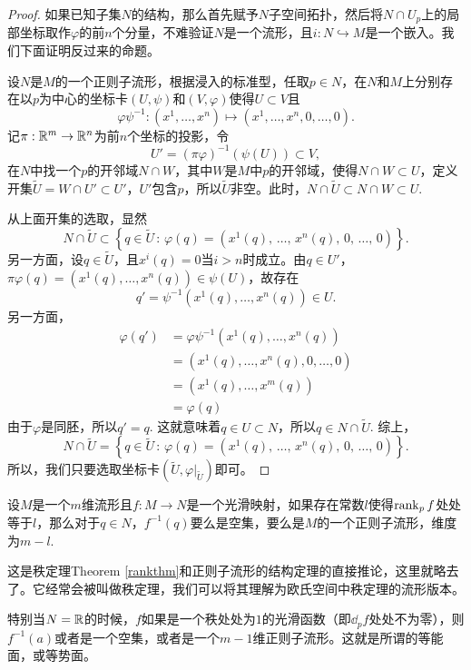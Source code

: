 \begin{proof}
如果已知子集$N$的结构，那么首先赋予$N$子空间拓扑，然后将$N\cap U_p$上的局部坐标取作$\varphi$的前$n$个分量，不难验证$N$是一个流形，且$i:N\hookrightarrow M$是一个嵌入。我们下面证明反过来的命题。

设$N$是$M$的一个正则子流形，根据浸入的标准型，任取$p\in N$，在$N$和$M$上分别存在以$p$为中心的坐标卡$(U,\psi)$和$(V,\varphi)$使得$U\subset V$且
\[
	\varphi\psi^{-1}:(x^1,\dots,x^n)\mapsto (x^1,\dots,x^n,0,\dots,0).
\]
记$\pi:\mathbb{R}^m\to \mathbb{R}^n$为前$n$个坐标的投影，令
\[
	U'=(\pi\varphi)^{-1}(\psi(U))\subset V,
\]
在$N$中找一个$p$的开邻域$N\cap W$，其中$W$是$M$中$p$的开邻域，使得$N\cap W\subset U$，定义开集$\tilde{U}=W\cap U'\subset U'$，$U'$包含$p$，所以$\tilde{U}$非空。此时，$N\cap \tilde{U}\subset N\cap W\subset U$.

从上面开集的选取，显然
\[
	N\cap \tilde{U}\subset \left\{q\in \tilde{U}\,:\,\varphi(q)=\left(x^1(q)\text{, $\dots$, }x^n(q)\text{, }0\text{, $\dots$, }0\right)\right\}.
\]
另一方面，设$q\in \tilde{U}$，且$x^i(q)=0$当$i> n$时成立。由$q\in U'$，$\pi\varphi(q)=(x^1(q),\dots,x^n(q))\in \psi(U)$，故存在
\[
	q'=\psi^{-1}(x^1(q),\dots,x^n(q))\in U.
\]
另一方面，
\begin{align*}
\varphi(q')&=\varphi\psi^{-1}(x^1(q),\dots,x^n(q))\\
&=(x^1(q),\dots,x^n(q),0,\dots,0)\\
&=(x^1(q),\dots,x^m(q))\\
&=\varphi(q)
\end{align*}
由于$\varphi$是同胚，所以$q'=q$. 这就意味着$q\in U\subset N$，所以$q\in N\cap \tilde{U}$. 综上，
\[
	N\cap \tilde{U}= \left\{q\in \tilde{U}\,:\,\varphi(q)=\left(x^1(q)\text{, $\dots$, }x^n(q)\text{, }0\text{, $\dots$, }0\right)\right\}.
\]
所以，我们只要选取坐标卡$(\tilde{U},\varphi|_{\tilde{U}})$即可。
\end{proof}

\begin{pro}
\label{ranktheo}设$M$是一个$m$维流形且$f:M\to N$是一个光滑映射，如果存在常数$l$使得$\operatorname{rank}_p f$处处等于$l$，那么对于$q\in N$，$f^{-1}(q)$要么是空集，要么是$M$的一个正则子流形，维度为$m-l$.
\end{pro} 

这是秩定理Theorem \ref{rankthm}和正则子流形的结构定理的直接推论，这里就略去了。它经常会被叫做秩定理，我们可以将其理解为欧氏空间中秩定理的流形版本。

特别当$N=\mathbb{R}$的时候，$f$如果是一个秩处处为$1$的光滑函数（即$\dd_p f$处处不为零），则$f^{-1}(a)$或者是一个空集，或者是一个$m-1$维正则子流形。这就是所谓的等能面，或等势面。

